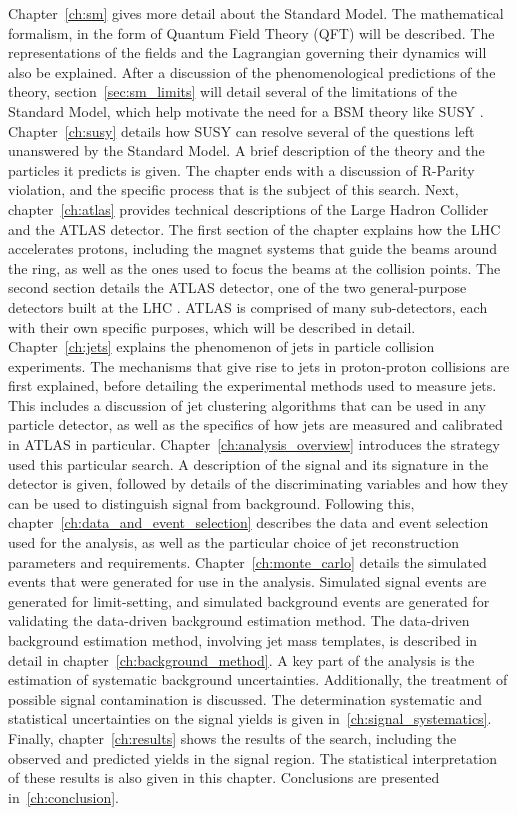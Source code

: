 Chapter~\ref{ch:sm} gives more detail about the Standard Model.
The mathematical formalism, in the form of Quantum Field Theory (QFT) will be described.
The representations of the fields and the Lagrangian governing their dynamics will also be explained.
After a discussion of the phenomenological predictions of the theory, section~\ref{sec:sm_limits} will detail several of the limitations of the Standard Model, which help motivate the need for a BSM theory like SUSY .
Chapter~\ref{ch:susy} details how SUSY can resolve several of the questions left unanswered by the Standard Model.
A brief description of the theory and the particles it predicts is given.
The chapter ends with a discussion of R-Parity violation, and the specific process that is the subject of this search.
Next, chapter~\ref{ch:atlas} provides technical descriptions of the Large Hadron Collider and the ATLAS detector.
The first section of the chapter explains how the LHC accelerates protons, including the magnet systems that guide the beams around the ring, as well as the ones used to focus the beams at the collision points.
The second section details the ATLAS detector, one of the two general-purpose detectors built at the LHC .
ATLAS is comprised of many sub-detectors, each with their own specific purposes, which will be described in detail.
Chapter~\ref{ch:jets} explains the phenomenon of jets in particle collision experiments.
The mechanisms that give rise to jets in proton-proton collisions are first explained, before detailing the experimental methods used to measure jets.
This includes a discussion of jet clustering algorithms that can be used in any particle detector, as well as the specifics of how jets are measured and calibrated in ATLAS in particular.
Chapter~\ref{ch:analysis_overview} introduces the strategy used this particular search.
A description of the signal and its signature in the detector is given, followed by details of the discriminating variables and how they can be used to distinguish signal from background.
Following this, chapter~\ref{ch:data_and_event_selection} describes the data and event selection used for the analysis, as well as the particular choice of jet reconstruction parameters and requirements.
Chapter~\ref{ch:monte_carlo} details the simulated events that were generated for use in the analysis.
Simulated signal events are generated for limit-setting, and simulated background events are generated for validating the data-driven background estimation method.
The data-driven background estimation method, involving jet mass templates, is described in detail in chapter~\ref{ch:background_method}.
A key part of the analysis is the estimation of systematic background uncertainties.
Additionally, the treatment of possible signal contamination is discussed.
The determination systematic and statistical uncertainties on the signal yields is given in~\ref{ch:signal_systematics}.
Finally, chapter~\ref{ch:results} shows the results of the search, including the observed and predicted yields in the signal region.
The statistical interpretation of these results is also given in this chapter.
Conclusions are presented in~\ref{ch:conclusion}.
